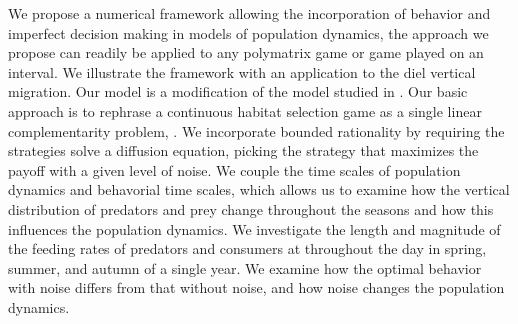 We propose a numerical framework allowing the incorporation of behavior and imperfect decision making in models of population dynamics, the approach we propose can readily be applied to any polymatrix game or game played on an interval. We illustrate the framework with an application to the diel vertical migration. Our model is a modification of the model studied in \citep{verticalmigration}. Our basic approach is to rephrase a continuous habitat selection game as a single linear complementarity problem, \citep{miller1991copositive}. We incorporate bounded rationality by requiring the strategies solve a diffusion equation, picking the strategy that maximizes the payoff with a given level of noise.
We couple the time scales of population dynamics and behavorial time scales, which allows us to examine how the vertical distribution of predators and prey change throughout the seasons and how this influences the population dynamics. We investigate the length and magnitude of the feeding rates of predators and consumers at throughout the day in spring, summer, and autumn of a single year. We examine how the optimal behavior with noise differs from that without noise, and how noise changes the population dynamics.

